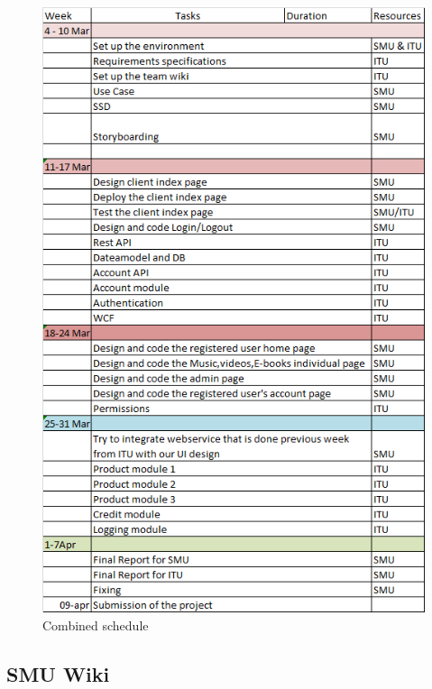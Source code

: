 \begin{figure}[H]
\includegraphics[scale=0.8]{illustrations/SmuSchedule.png}
\caption{Combined schedule}
\end{figure}
\subsection{SMU Wiki}
\label{smuwiki}
\newpage

